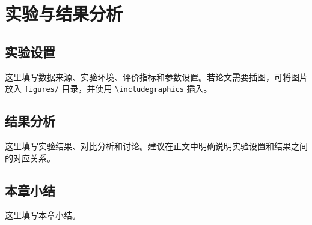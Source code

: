 
\chapter{实验与结果分析}
\label{ch:experiment}

\section{实验设置}

这里填写数据来源、实验环境、评价指标和参数设置。若论文需要插图，可将图片放入 \texttt{figures/} 目录，并使用 \texttt{\textbackslash includegraphics} 插入。

\section{结果分析}

这里填写实验结果、对比分析和讨论。建议在正文中明确说明实验设置和结果之间的对应关系。

\section{本章小结}

这里填写本章小结。
